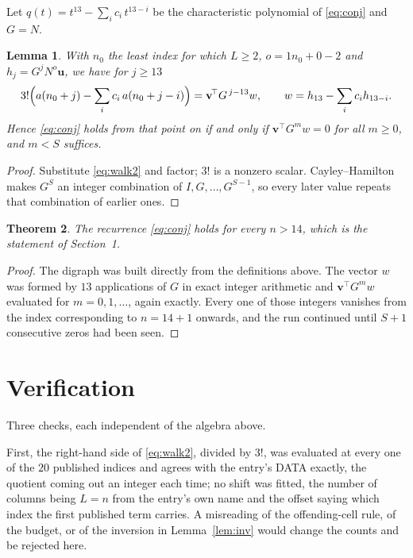 \documentclass[11pt,a4paper]{article}
\theoremstyle{plain}
\newtheorem{theorem}{Theorem}
\newtheorem{lemma}[theorem]{Lemma}
\theoremstyle{definition}
\begin{document}
Let $q(t)=t^{13}-\sum_i c_i\,t^{13-i}$ be the characteristic polynomial of
\eqref{eq:conj} and $G=N$.

\begin{lemma}\label{lem:crit}
With $n_0$ the least index for which $L\ge2$, $o=1n_0+0-2$ and
$h_j=G^{j}N^{o}\mathbf{u}$, we have for $j\ge13$
\[
3!\Bigl(a(n_0+j)-\sum_i c_i\,a(n_0+j-i)\Bigr)=\mathbf{v}^{\!\top}G^{\,j-13}w,
\qquad w=h_{13}-\sum_i c_i h_{13-i} .
\]
Hence \eqref{eq:conj} holds from that point on if and only if
$\mathbf{v}^{\!\top}G^{m}w=0$ for all $m\ge0$, and $m<S$ suffices.
\end{lemma}

\begin{proof}
Substitute \eqref{eq:walk2} and factor; $3!$ is a nonzero scalar. Cayley--Hamilton
makes $G^{S}$ an integer combination of $I,G,\dots,G^{S-1}$, so every later value repeats
that combination of earlier ones.
\end{proof}

\begin{theorem}
The recurrence \eqref{eq:conj} holds for every $n>14$, which is the statement of
Section~1.
\end{theorem}

\begin{proof}
The digraph was built directly from the definitions above. The vector $w$ was formed by
$13$ applications of $G$ in exact integer arithmetic and $\mathbf{v}^{\!\top}G^{m}w$
evaluated for $m=0,1,\dots$, again exactly. Every one of those integers vanishes from the
index corresponding to $n=14+1$ onwards, and the run continued until $S+1$ consecutive
zeros had been seen.
\end{proof}

\section{Verification}

Three checks, each independent of the algebra above.

First, the right-hand side of \eqref{eq:walk2}, divided by $3!$, was evaluated at every
one of the $20$ published indices and agrees with the entry's DATA exactly, the quotient
coming out an integer each time; no shift was fitted, the number of columns being
$L=n$ from the entry's own name and the offset saying which index the first published
term carries. A misreading of the offending-cell rule, of the budget, or of the inversion in
Lemma~\ref{lem:inv} would change the counts and be rejected here.
\end{document}
